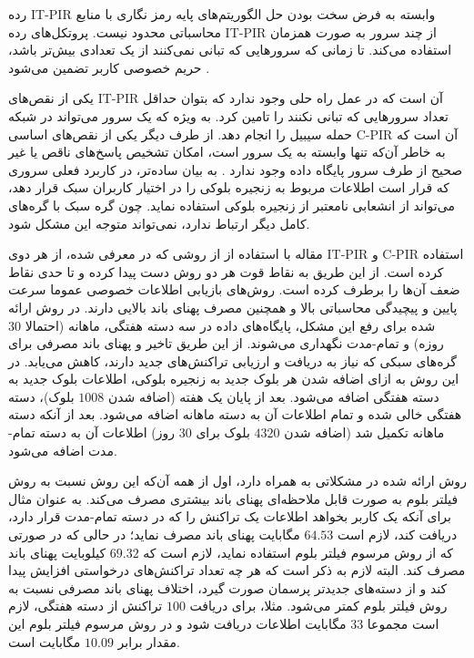 رده IT-PIR وابسته به فرض سخت بودن حل الگوریتم‌های پایه رمز نگاری با منابع محاسباتی محدود نیست. پروتکل‌های رده IT-PIR از چند سرور به صورت همزمان استفاده می‌کند. تا زمانی که سرورهایی که تبانی نمی‌کنند از یک تعدادی بیش‌تر باشد، حریم خصوصی کاربر تضمین می‌شود \cite{Devet2014}. 

یکی از نقص‌های IT-PIR آن است که در عمل راه حلی وجود ندارد که بتوان حداقل تعداد سرورهایی که تبانی نکنند را تامین کرد. به ویژه که یک سرور می‌تواند در شبکه حمله سیبیل
را انجام دهد. از طرف دیگر یکی از نقص‌های اساسی C-PIR آن است که به خاطر آن‌که تنها وابسته به یک سرور است، امکان تشخیص پاسخ‌های ناقص یا غیر صحیح از طرف سرور پایگاه داده وجود ندارد \cite{Qin2019}. به بیان ساده‌تر، در کاربرد فعلی سروری که قرار است اطلاعات مربوط به زنجیره بلوکی را در اختیار کاربران سبک قرار دهد،‌ می‌تواند از انشعابی نامعتبر از زنجیره بلوکی استفاده نماید. چون گره سبک با گره‌های کامل دیگر ارتباط ندارد، نمی‌تواند متوجه این مشکل شود.

مقاله \cite{Qin2019} با استفاده از از روشی که در \cite{Devet2014} معرفی شده، از هر دوی  IT-PIR و  C-PIR استفاده کرده است. از این طریق به نقاط قوت هر دو روش دست پیدا کرده و تا حدی نقاط ضعف آن‌ها را برطرف کرده است. روش‌های بازیابی اطلاعات خصوصی عموما سرعت پایین و پیچیدگی محاسباتی بالا و همچنین مصرف پهنای باند بالایی دارند. در روش ارائه شده  \cite{Qin2019} برای رفع این مشکل، پایگاه‌های داده‌ در سه دسته هفتگی، ماهانه (احتمالا
$30$
روزه) و تمام-مدت نگهداری می‌شوند. از این طریق تاخیر و پهنای باند مصرفی برای گره‌های سبکی که نیاز به دریافت و ارزیابی تراکنش‌های جدید دارند، کاهش می‌یابد. در این روش به ازای اضافه شدن هر بلوک جدید به زنجیره بلوکی، اطلاعات بلوک جدید به دسته هفتگی اضافه می‌شود. بعد از پایان یک هفته (اضافه شدن $1008$ بلوک)، دسته هفتگی خالی شده و تمام اطلاعات آن به دسته ماهانه اضافه می‌شود. بعد از آنکه دسته ماهانه تکمیل شد (اضافه شدن $4320$ بلوک برای $30$ روز) اطلاعات آن به دسته تمام-مدت اضافه می‌شود. 


روش ارائه شده در \cite{Qin2019} مشکلاتی به همراه دارد، اول از همه آن‌که این روش نسبت به روش فیلتر بلوم \cite{Hearn2013} به صورت قابل ملاحظه‌ای پهنای باند بیشتری مصرف می‌کند. به عنوان مثال برای آنکه یک کاربر بخواهد اطلاعات یک تراکنش را که در دسته تمام-مدت قرار دارد، دریافت کند، لازم است $64.53$ مگابایت پهنای باند مصرف نماید؛ در حالی که در صورتی که از روش مرسوم فیلتر بلوم استفاده نماید، لازم است که $69.32$ کیلوبایت پهنای باند مصرف کند. البته لازم به ذکر است که هر چه تعداد تراکنش‌های درخواستی افزایش پیدا کند و از دسته‌های جدیدتر پرسمان صورت گیرد، اختلاف پهنای باند مصرفی نسبت به روش فیلتر بلوم کمتر می‌شود. مثلا، برای دریافت $100$ تراکنش از دسته هفتگی، لازم است مجموعا $33$ مگابایت اطلاعات دریافت شود و در روش مرسوم فیلتر بلوم این مقدار برابر $10.09$ مگابایت است.

